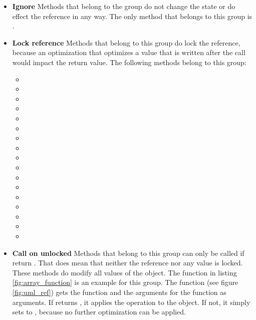 \begin{itemize}
\item{\textbf{Ignore}} Methods that belong to the group do not change the state or do effect the reference in any way. The only method that belongs to this group is .

\item{\textbf{Lock reference}} Methods that belong to this group do lock the reference, because an optimization that optimizes a value that is written after the call would impact the return value. The following methods belong to this group:

\begin{itemize}
\item{}
\item{}
\item{}
\item{}
\item{}
\item{}
\item{}
\item{}
\item{}
\item{}
\item{}
\item{}
\item{}
\item{}
\item{}
\item{}
\item{}
\end{itemize}

\item{\textbf{Call on unlocked}} Methods that belong to this group can only be called if  return . That does mean that neither the reference nor any value is locked. These methods do modify all values of the object. The  function in listing \ref{fig:array_function} is an example for this group. The function  (see figure \ref{fig:uml_ref}) gets the function and the arguments for the function as arguments. If  returns , it applies the operation to the object. If not, it simply sets  to , because no further optimization can be applied.


\end{itemize}
